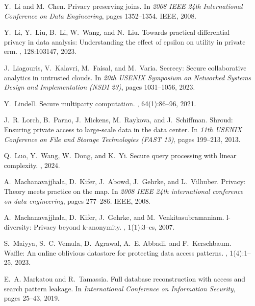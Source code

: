 \documentclass[11pt]{article}
\begin{document}
\begin{thebibliography}{140}
\begin{small}
Y.~Li and M.~Chen.
\newblock Privacy preserving joins.
\newblock In {\em 2008 IEEE 24th International Conference on Data Engineering},
  pages 1352--1354. IEEE, 2008.

Y.~Li, Y.~Liu, B.~Li, W.~Wang, and N.~Liu.
\newblock Towards practical differential privacy in data analysis:
  Understanding the effect of epsilon on utility in private erm.
, 128:103147, 2023.

J.~Liagouris, V.~Kalavri, M.~Faisal, and M.~Varia.
\newblock Secrecy: Secure collaborative analytics in untrusted clouds.
\newblock In {\em 20th USENIX Symposium on Networked Systems Design and
  Implementation (NSDI 23)}, pages 1031--1056, 2023.

Y.~Lindell.
\newblock Secure multiparty computation.
, 64(1):86–96, 2021.

J.~R. Lorch, B.~Parno, J.~Mickens, M.~Raykova, and J.~Schiffman.
\newblock Shroud: Ensuring private access to large-scale data in the data
  center.
\newblock In {\em 11th USENIX Conference on File and Storage Technologies (FAST
  13)}, pages 199--213, 2013.

Q.~Luo, Y.~Wang, W.~Dong, and K.~Yi.
\newblock Secure query processing with linear complexity.
, 2024.

A.~Machanavajjhala, D.~Kifer, J.~Abowd, J.~Gehrke, and L.~Vilhuber.
\newblock Privacy: Theory meets practice on the map.
\newblock In {\em 2008 IEEE 24th international conference on data engineering},
  pages 277--286. IEEE, 2008.

A.~Machanavajjhala, D.~Kifer, J.~Gehrke, and M.~Venkitasubramaniam.
\newblock l-diversity: Privacy beyond k-anonymity.
,
  1(1):3--es, 2007.

S.~Maiyya, S.~C. Vemula, D.~Agrawal, A.~E. Abbadi, and F.~Kerschbaum.
\newblock Waffle: An online oblivious datastore for protecting data access
  patterns.
, 1(4):1--25, 2023.

E.~A. Markatou and R.~Tamassia.
\newblock Full database reconstruction with access and search pattern leakage.
\newblock In {\em International Conference on Information Security}, pages
  25--43, 2019.


\end{small}
\end{thebibliography}
\end{document}
